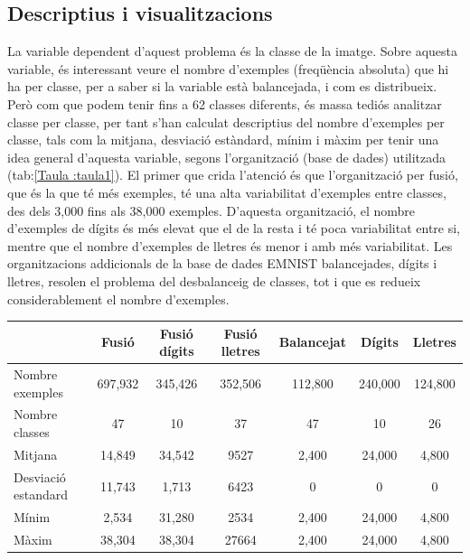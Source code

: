 \documentclass[12pt, spanish]{article}
\begin{document}
\subsection{Descriptius i visualitzacions}

La variable dependent d'aquest problema és la classe de la imatge. Sobre aquesta variable, és interessant veure el nombre d'exemples (freqüència absoluta) que hi ha per classe, per a saber si la variable està balancejada, i com es distribueix. Però com que podem tenir fins a 62 classes diferents, és massa tediós analitzar classe per classe, per tant s'han calculat descriptius del nombre d'exemples per classe, tals com la mitjana, desviació estàndard, mínim i màxim per tenir una idea general d'aquesta variable, segons l'organització (base de dades) utilitzada (tab:\ref{Taula :taula1}). El primer que crida l'atenció és que l'organització per fusió, que és la que té més exemples, té una alta variabilitat d'exemples entre classes, des dels 3,000 fins als 38,000 exemples. D'aquesta organització, el nombre d'exemples de dígits és més elevat que el de la resta i té poca variabilitat entre si, mentre que el nombre d'exemples de lletres és menor i amb més variabilitat. Les organitzacions addicionals de la base de dades EMNIST balancejades, dígits i lletres, resolen el problema del desbalanceig de classes, tot i que es redueix considerablement el nombre d'exemples. 

\begin{table}[hbt!]
\centering
\begin{tabular}{lcccccc}  
\toprule
                            & Fusió & Fusió dígits & Fusió lletres & Balancejat & Dígits & Lletres \\  
\midrule
Nombre exemples    & 697,932 & 345,426  & 352,506 & 112,800 & 240,000 & 124,800 \\
Nombre classes        & 47         & 10          & 37         & 47        & 10          & 26      \\
Mitjana                   & 14,849   & 34,542    & 9527     & 2,400    & 24,000    & 4,800 \\
Desviació estandard  & 11,743   & 1,713      & 6423    & 0           & 0            & 0       \\
Mínim                     & 2,534      & 31,280   & 2534    & 2,400      & 24,000   & 4,800 \\
Màxim                    & 38,304    & 38,304   & 27664   & 2,400      & 24,000   & 4,800 \\
\bottomrule
\end{tabular}
\label{tab:taula1}
\end{table}
\end{document}
